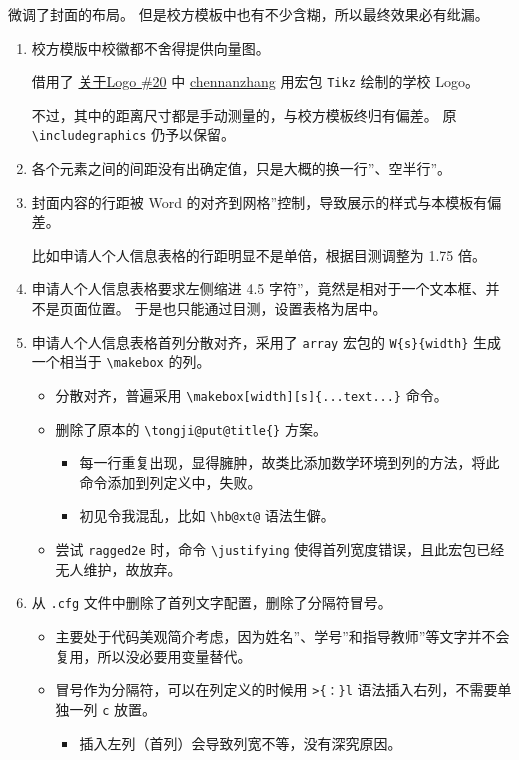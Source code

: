 \documentclass[../Main/thesis.tex]{subfiles}
\begin{document}
微调了封面的布局。 但是校方模板中也有不少含糊，所以最终效果必有纰漏。

\begin{enumerate}
\item
  校方模版中校徽都不舍得提供向量图。

  借用了
  \href{https://github.com/marquistj13/TongjiThesis/issues/20}{关于Logo
  \#20} 中 \href{https://github.com/chennanzhang}{chennanzhang} 用宏包
  \texttt{Tikz} 绘制的学校 Logo。

  不过，其中的距离尺寸都是手动测量的，与校方模板终归有偏差。 原
  \texttt{\textbackslash{}includegraphics} 仍予以保留。
\item
  各个元素之间的间距没有出确定值，只是大概的换一行''、空半行''。
\item
  封面内容的行距被 Word
  的对齐到网格''控制，导致展示的样式与本模板有偏差。

  比如申请人个人信息表格的行距明显不是单倍，根据目测调整为 1.75 倍。
\item
  申请人个人信息表格要求左侧缩进 4.5
  字符''，竟然是相对于一个文本框、并不是页面位置。
  于是也只能通过目测，设置表格为居中。
\item
  申请人个人信息表格首列分散对齐，采用了 \texttt{array} 宏包的
  \texttt{W\{s\}\{width\}} 生成一个相当于
  \texttt{\textbackslash{}makebox} 的列。

  \begin{itemize}
  \item
    分散对齐，普遍采用
    \texttt{\textbackslash{}makebox[width][s]\{...text...\}}
    命令。
  \item
    删除了原本的 \texttt{\textbackslash{}tongji@put@title\{\}} 方案。

    \begin{itemize}
    \item
      每一行重复出现，显得臃肿，故类比添加数学环境到列的方法，将此命令添加到列定义中，失败。
    \item
      初见令我混乱，比如 \texttt{\textbackslash{}hb@xt@} 语法生僻。
    \end{itemize}
  \item
    尝试 \texttt{ragged2e} 时，命令 \texttt{\textbackslash{}justifying}
    使得首列宽度错误，且此宏包已经无人维护，故放弃。
  \end{itemize}
\item
  从 \texttt{.cfg} 文件中删除了首列文字配置，删除了分隔符冒号。

  \begin{itemize}
  \item
    主要处于代码美观简介考虑，因为姓名''、学号''和指导教师''等文字并不会复用，所以没必要用变量替代。
  \item
    冒号作为分隔符，可以在列定义的时候用 \texttt{\textgreater{}\{：\}l}
    语法插入右列，不需要单独一列 \texttt{c} 放置。

    \begin{itemize}
    \item
      插入左列（首列）会导致列宽不等，没有深究原因。
    \end{itemize}
  \end{itemize}
\end{enumerate}
\end{document}
